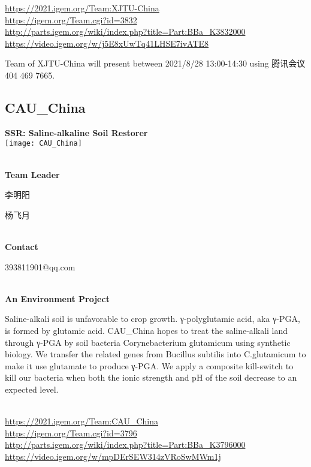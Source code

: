 \url{https://2021.igem.org/Team:XJTU-China }\\
\url{https://igem.org/Team.cgi?id=3832 }\\
\url{http://parts.igem.org/wiki/index.php?title=Part:BBa_K3832000 }\\
\url{https://video.igem.org/w/j5E8xUwTq41LHSE7ivATE8 }\\

\vfill{}









Team of XJTU-China will present between      2021/8/28 13:00-14:30   using 腾讯会议 404 469 7665.
\newpage


\subsection{\textcolor{Blu}{ CAU\_China } }
\vspace{5mm}
\begin{center}
\large{
  \textbf{ SSR: Saline-alkaline Soil Restorer }\\
  \texttt{[image: CAU\_China]}
}
\end{center}
\textbf{\\Team Leader}

  李明阳

  杨飞月


\textbf{\\Contact}

  393811901@qq.com


\textbf{\\An Environment Project\\}\begin{spacing}{1.5}

Saline-alkali soil is unfavorable to crop growth. γ-polyglutamic acid, aka γ-PGA, is formed by glutamic acid. CAU\_China hopes to treat the saline-alkali land through γ-PGA by soil bacteria Corynebacterium glutamicum using synthetic biology. We transfer the related genes from Bucillus subtilis into C.glutamicum to make it use glutamate to produce γ-PGA. We apply a composite kill-switch to kill our bacteria when both the ionic strength and pH of the soil decrease to an expected level.\end{spacing}
\\

\url{https://2021.igem.org/Team:CAU\_China }\\
\url{https://igem.org/Team.cgi?id=3796 }\\
\url{http://parts.igem.org/wiki/index.php?title=Part:BBa_K3796000 }\\
\url{https://video.igem.org/w/mpDErSEW314zVRoSwMWm1j }\\

